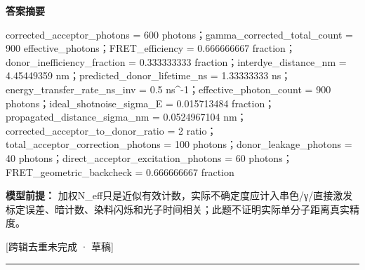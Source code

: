 \documentclass[UTF8,11pt,a4paper]{ctexart}
\begin{document}
\noindent\textbf{答案摘要}\par
corrected\_acceptor\_photons = 600 photons；gamma\_corrected\_total\_count = 900 effective\_photons；FRET\_efficiency = 0.666666667 fraction；donor\_inefficiency\_fraction = 0.333333333 fraction；interdye\_distance\_nm = 4.45449359 nm；predicted\_donor\_lifetime\_ns = 1.33333333 ns；energy\_transfer\_rate\_ns\_inv = 0.5 ns\textasciicircum{}-1；effective\_photon\_count = 900 photons；ideal\_shotnoise\_sigma\_E = 0.015713484 fraction；propagated\_distance\_sigma\_nm = 0.0524967104 nm；corrected\_acceptor\_to\_donor\_ratio = 2 ratio；total\_acceptor\_correction\_photons = 100 photons；donor\_leakage\_photons = 40 photons；direct\_acceptor\_excitation\_photons = 60 photons；FRET\_geometric\_backcheck = 0.666666667 fraction\par
\noindent\textbf{模型前提：}
加权N\_eff只是近似有效计数，实际不确定度应计入串色/γ/直接激发标定误差、暗计数、染料闪烁和光子时间相关；此题不证明实际单分子距离真实精度。\par
\noindent\textcolor{red!65!black}{[跨辑去重未完成 · 草稿]} \par
\medskip\hrule\medskip
{}
\end{document}
